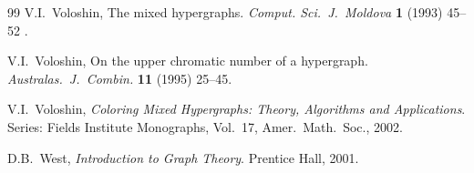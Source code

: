 \documentclass{article}
\theoremstyle{definition}
\begin{document}
\begin{thebibliography}{99}
V.I.\ Voloshin, The mixed hypergraphs. \emph{Comput. Sci.\ J.\ Moldova} \textbf{1} (1993) 45--52 .


V.I.\ Voloshin, On the upper chromatic number of a hypergraph. \emph{Australas.\ J.\ Combin.} \textbf{11} (1995) 25--45.

V.I.\ Voloshin, \emph{Coloring Mixed Hypergraphs: Theory, Algorithms and
Applications}. Series: Fields Institute Monographs, Vol.\ 17, Amer.\ Math.\ Soc., 2002.

D.B.\ West,
\emph{Introduction to Graph Theory}.
Prentice Hall, 2001.
  

\end{thebibliography}
\end{document}

